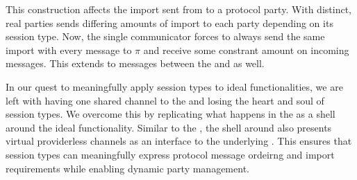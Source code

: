 This construction affects the import sent from \Z to a protocol party. With distinct, real parties \Z sends differing amounts of import to each party depending on its session type.
Now, the single communicator forces \Z to always send the same import with every message to $\pi$ and receive some constrant amount on incoming messages.
This extends to messages between the \partywrapper and \F as well.

In our quest to meaningfully apply session types to ideal functionalities, we are left with \F having one shared channel to the \partywrapper and losing the heart and soul of session types.
We overcome this by replicating what happens in the \partywrapper as a shell around the ideal functionality.
Similar to the \partywrapper, the shell around \F also presents virtual providerless channels as an interface to the underlying \F. This ensures that session types can meaningfully express protocol message ordeirng and import requirements while enabling dynamic party management. 

